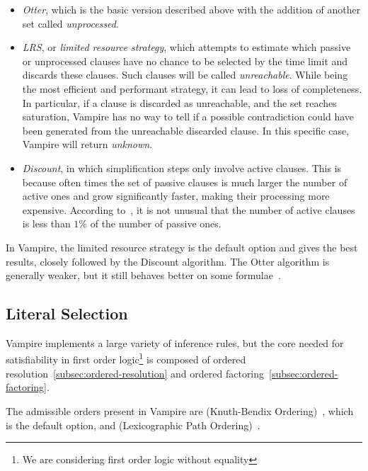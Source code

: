 \begin{itemize}
  \item \emph{Otter}, which is the basic version described above with the addition of another set called \emph{unprocessed}.
  \item \emph{LRS}, or \emph{limited resource strategy}, which attempts to estimate which passive or unprocessed clauses have no chance to be selected by the time limit and discards these clauses.
                    Such clauses will be called \emph{unreachable}.
                    While being the most efficient and performant strategy, it can lead to loss of completeness.
                    In particular, if a clause is discarded as unreachable, and the set reaches saturation, Vampire has no way to tell if a possible contradiction could have been generated from the unreachable discarded clause.
                    In this specific case, Vampire will return \emph{unknown}.
  \item \emph{Discount}, in which simplification steps only involve active clauses.
                          This is because often times the set of passive clauses is much larger the number of active ones and grow significantly faster, making their processing more expensive.
                          According to~\cite{kovacs2013vampire}, it is not unusual that the number of active clauses is less than \(1\%\) of the number of passive ones.
\end{itemize}

In Vampire, the limited resource strategy is the default option and gives the best results, closely followed by the Discount algorithm.
The Otter algorithm is generally weaker, but it still behaves better on some formulae~\cite{kovacs2013vampire}.

\subsection{Literal Selection}\label{subsec:literal-selection}

Vampire implements a large variety of inference rules, but the core needed for satisfiability in first order logic\footnote{
  We are considering first order logic without equality
} is composed of ordered resolution~\ref{subsec:ordered-resolution} and ordered factoring~\ref{subsec:ordered-factoring}.

The admissible orders present in Vampire are  (Knuth-Bendix Ordering)~\cite{knuth1970simple}, which is the default option, and  (Lexicographic Path Ordering)~\cite{dershowitz1982orderings}.

